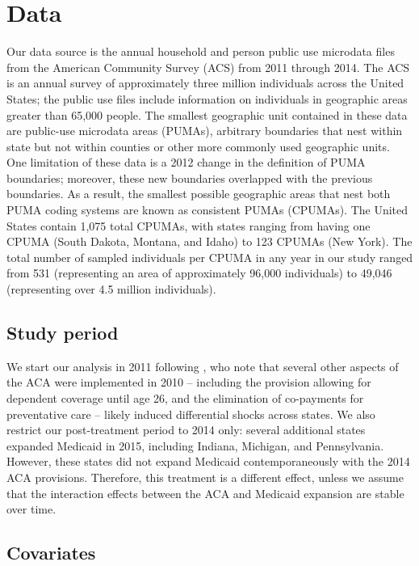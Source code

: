 \documentclass[12pt]{article}
\begin{document}
\section{Data}

Our data source is the annual household and person public use microdata files from the American Community Survey (ACS) from 2011 through 2014. The ACS is an annual survey of approximately three million individuals across the United States; the public use files include information on individuals in geographic areas greater than 65,000 people. The smallest geographic unit contained in these data are public-use microdata areas (PUMAs), arbitrary boundaries that nest within state but not within counties or other more commonly used geographic units. One limitation of these data is a 2012 change in the definition of PUMA boundaries; moreover, these new boundaries overlapped with the previous boundaries. As a result, the smallest possible geographic areas that nest both PUMA coding systems are known as consistent PUMAs (CPUMAs). The United States contain 1,075 total CPUMAs, with states ranging from having one CPUMA (South Dakota, Montana, and Idaho) to 123 CPUMAs (New York). The total number of sampled individuals per CPUMA in any year in our study ranged from 531 (representing an area of approximately 96,000 individuals) to 49,046 (representing over 4.5 million individuals). 

\subsection{Study period}

We start our analysis in 2011 following \cite{courtemanche2017early}, who note that several other aspects of the ACA were implemented in 2010 -- including the provision allowing for dependent coverage until age 26, and the elimination of co-payments for preventative care -- likely induced differential shocks across states. We also restrict our post-treatment period to 2014 only: several additional states expanded Medicaid in 2015, including Indiana, Michigan, and Pennsylvania. However, these states did not expand Medicaid contemporaneously with the 2014 ACA provisions. Therefore, this treatment is a different effect, unless we assume that the interaction effects between the ACA and Medicaid expansion are stable over time. 

\subsection{Covariates}
\end{document}
